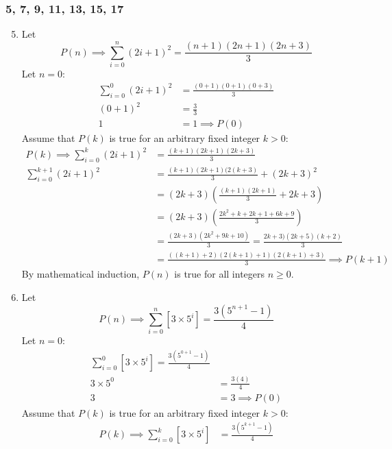 \documentclass[12pt, A4]{article}
\begin{document}
			\subsubsection*{5, 7, 9, 11, 13, 15, 17}
				\begin{enumerate}
					\setcounter{enumi}{4}
					\item
						Let
							\[P(n) \implies \sum_{i = 0}^{n}(2i + 1)^2 = \frac{(n + 1)(2n + 1)(2n + 3)}{3}\]
							Let \(n = 0\):
							\begin{align*}
								\sum_{i = 0}^0(2i + 1)^2 &= \frac{(0 + 1)(0 + 1)(0 + 3)}{3} \\
								(0 + 1)^2 &= \frac{3}{3} \\
								1 &= 1 \implies P(0)
							\end{align*}
							Assume that \(P(k)\) is true for an arbitrary fixed integer \(k > 0\):
							\begin{align*}
								P(k) \implies \sum_{i = 0}^k(2i + 1)^2 &= \frac{(k + 1)(2k + 1)(2k + 3)}{3} \\
								\sum_{i = 0}^{k + 1}(2i + 1)^2 &= \frac{(k + 1)(2k + 1)(2(k + 3)}{3} + (2k + 3)^2 \\
									&= (2k + 3)\left(\frac{(k + 1)(2k + 1)}{3} + 2k + 3\right) \\
									&= (2k + 3)\left(\frac{2k^2 + k + 2k + 1 + 6k + 9}{3}\right) \\
									&= \frac{(2k + 3)(2k^2 + 9k + 10)}{3}
											=  \frac{2k + 3)(2k + 5)(k + 2)}{3} \\
									&= \frac{((k + 1) + 2)(2(k + 1) + 1)(2(k + 1) + 3)}{3}
											\implies P(k + 1)
							\end{align*}
							By mathematical induction, \(P(n)\) is true for all integers \(n \ge 0\).
					\setcounter{enumi}{6}
					\item
						Let
							\[P(n) \implies \sum_{i = 0}^n\left[3 \times 5^i\right] = \frac{3\left(5^{n + 1} - 1\right)}{4}\]
							Let \(n = 0\):
							\begin{align*}
								\sum_{i = 0}^0\left[3 \times 5^i\right] = \frac{3\left(5^{0 + 1} - 1\right)}{4} \\
								3 \times 5^0 &= \frac{3(4)}{4} \\
								3 &= 3 \implies P(0)
							\end{align*}
							Assume that \(P(k)\) is true for an arbitrary fixed integer \(k > 0\):
							\begin{align*}
								P(k) \implies \sum_{i = 0}^k\left[3 \times 5^i\right] &= \frac{3\left(5^{k + 1} - 1\right)}{4} \\

\end{align*}
\end{enumerate}
\end{document}
